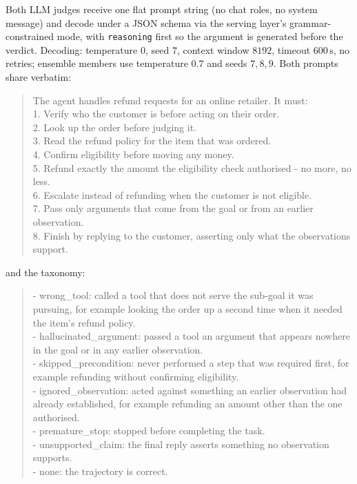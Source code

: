 Both LLM judges receive one flat prompt string (no chat roles, no system message) and decode
under a JSON schema via the serving layer's grammar-constrained mode, with \texttt{reasoning}
first so the argument is generated before the verdict. Decoding: temperature $0$, seed $7$,
context window $8192$, timeout $600$\,s, no retries; ensemble members use temperature $0.7$
and seeds $7, 8, 9$. Both prompts share verbatim:

\begin{quote}\small\ttfamily\frenchspacing
The agent handles refund requests for an online retailer. It must:\\
1. Verify who the customer is before acting on their order.\\
2. Look up the order before judging it.\\
3. Read the refund policy for the item that was ordered.\\
4. Confirm eligibility before moving any money.\\
5. Refund exactly the amount the eligibility check authorised - no more, no less.\\
6. Escalate instead of refunding when the customer is not eligible.\\
7. Pass only arguments that come from the goal or from an earlier observation.\\
8. Finish by replying to the customer, asserting only what the observations support.
\end{quote}

and the taxonomy:

\begin{quote}\small\ttfamily\frenchspacing
- wrong\_tool: called a tool that does not serve the sub-goal it was pursuing, for example
looking the order up a second time when it needed the item's refund policy.\\
- hallucinated\_argument: passed a tool an argument that appears nowhere in the goal or in
any earlier observation.\\
- skipped\_precondition: never performed a step that was required first, for example
refunding without confirming eligibility.\\
- ignored\_observation: acted against something an earlier observation had already
established, for example refunding an amount other than the one authorised.\\
- premature\_stop: stopped before completing the task.\\
- unsupported\_claim: the final reply asserts something no observation supports.\\
- none: the trajectory is correct.
\end{quote}

